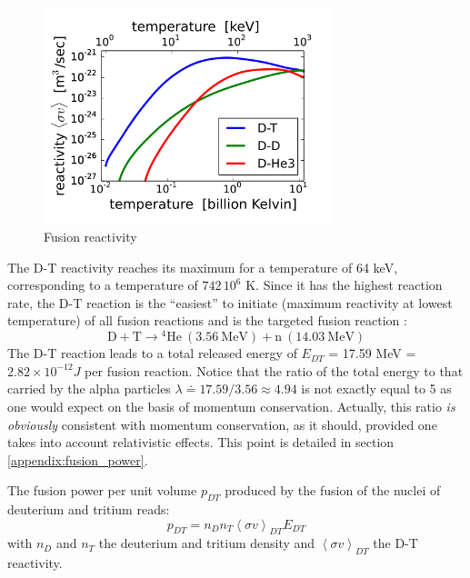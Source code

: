 \begin{figure} 
\begin{center}
\includegraphics[width=0.75\textwidth]{figures/reactivity_DT.png}
\caption{Fusion reactivity }
\label{fig:reactivity}
\end{center}
\end{figure}

The D-T reactivity reaches its maximum for a temperature of 64 keV, corresponding to a temperature of $742\,10^6$ K. Since it has the highest reaction rate, the D-T reaction is the “easiest” to initiate (maximum reactivity at lowest temperature) of all fusion reactions and is the targeted fusion reaction \cite{FusionCEA1987}: 
\begin{equation*}
\mathrm{D + T} \longrightarrow \mathrm{{}^4 He~(3.56~MeV) + n~(14.03~MeV)}
\end{equation*}
The D-T reaction leads to a total released energy of $E_{DT}$ = 17.59 \si{MeV} = $2.82\times 10^{-12} \si{J}$ per fusion reaction. Notice that the ratio of the total energy to that carried by the alpha particles $\lambda \doteq 17.59/3.56 \approx 4.94$ is not exactly equal to 5 as one would expect on the basis of momentum conservation. Actually, this ratio \emph{is obviously} consistent with momentum conservation, as it should, provided one takes into account relativistic effects. This point is detailed in section \ref{appendix:fusion_power}.

The fusion power per unit volume $p_{DT}$ produced by the fusion of the nuclei of deuterium and tritium reads: 
\begin{equation*}
  p_{DT} = n_D n_T \left< \sigma v \right>_{DT} E_{DT}
\end{equation*}
with $n_D$ and $n_T$ the deuterium and tritium density and $\left< \sigma v \right>_{DT}$ the D-T reactivity. 

